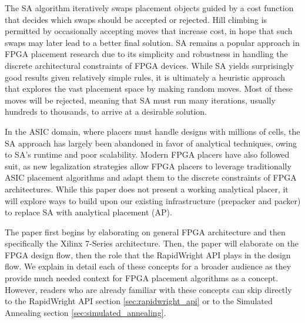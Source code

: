 The SA algorithm iteratively swaps placement objects guided by a cost function that decides which swaps should be accepted or rejected. 
Hill climbing is permitted by occasionally accepting moves that increase cost, in hope that such swaps may later lead to a better final solution. 
SA remains a popular approach in FPGA placement research due to its simplicity and robustness in handling the discrete architectural constraints of FPGA devices. 
While SA yields surprisingly good results given relatively simple rules, it is ultimately a heuristic approach that explores the vast placement space by making random moves. 
Most of these moves will be rejected, meaning that SA must run many iterations, usually hundreds to thousands, to arrive at a desirable solution. 

In the ASIC domain, where placers must handle designs with millions of cells, the SA approach has largely been abandoned in favor of analytical techniques, owing to SA's runtime and poor scalability. 
Modern FPGA placers have also followed suit, as new legalization strategies allow FPGA placers to leverage traditionally ASIC placement algorithms and adapt them to the discrete constraints of FPGA architectures. 
While this paper does not present a working analytical placer, it will explore ways to build upon our existing infrastructure (prepacker and packer) to replace SA with analytical placement (AP). 

The paper first begins by elaborating on general FPGA architecture and then specifically the Xilinx 7-Series architecture. 
Then, the paper will elaborate on the FPGA design flow, then the role that the RapidWright API plays in the design flow. 
We explain in detail each of these concepts for a broader audience as they provide much needed context for FPGA placement algorithms as a concept. 
However, readers who are already familiar with these concepts can skip directly to the RapidWright API section \ref{sec:rapidwright_api} or to the Simulated Annealing section \ref{sec:simulated_annealing}. 

